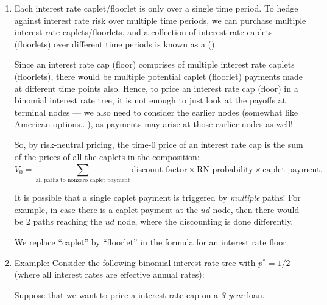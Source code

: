 \begin{enumerate}
\item \label{it:ir-cap-floor-rn-pricing-fmla} Each interest rate
caplet/floorlet is only over a single time period. To hedge against interest
rate risk over multiple time periods, we can purchase multiple interest rate
caplets/floorlets, and a collection of interest rate caplets (floorlets) over
different time periods is known as a  ().

Since an interest rate cap (floor) comprises of multiple interest rate
caplets (floorlets), there would be multiple potential caplet (floorlet)
payments made at different time points also. Hence, to price an interest rate
cap (floor) in a binomial interest rate tree, it is not enough to just look at
the payoffs at terminal nodes --- we also need to consider the earlier nodes
(somewhat like American options...), as payments may arise at those earlier
nodes as well!

So, by risk-neutral pricing, the time-0 price of an interest rate cap is the
sum of the prices of all the caplets in the composition:
\[
V_0=\boxed{\sum_{\text{all paths to nonzero caplet payment}}^{}\text{discount factor}\times \text{RN probability}\times \text{caplet payment}}.
\]
\begin{warning}
It is possible that a single caplet payment is triggered by \emph{multiple}
paths! For example, in case there is a caplet payment at the \(ud\) node, then
there would be 2 paths reaching the \(ud\) node, where the discounting is done
differently.
\end{warning}

We replace ``caplet'' by ``floorlet'' in the formula for an interest rate
floor.

\item Example: Consider the following binomial interest rate tree with
\(p^*=1/2\) (where all interest rates are effective annual rates):
\begin{center}
\end{center}
Suppose that we want to price a  interest rate cap on a 
\emph{3-year} loan.


\end{enumerate}
